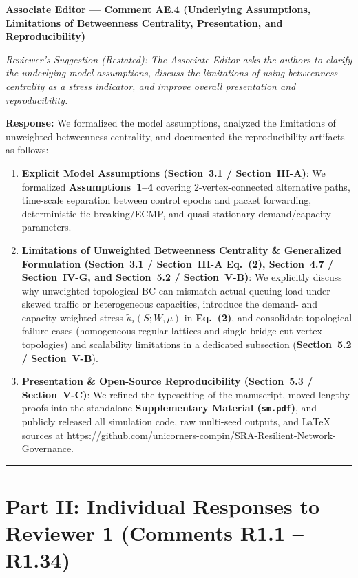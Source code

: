 \documentclass[11pt,a4paper]{article}
\newcommand{\cbox}[2]{%
  \vspace{0.6em}\noindent\textbf{#1}\par\smallskip
  \noindent\textit{Reviewer's Suggestion (Restated):} \textit{#2}\par\smallskip
}
\begin{document}
\hrulefill

\cbox{Associate Editor --- Comment AE.4 (Underlying Assumptions, Limitations of Betweenness Centrality, Presentation, and Reproducibility)}{The Associate Editor asks the authors to clarify the underlying model assumptions, discuss the limitations of using betweenness centrality as a stress indicator, and improve overall presentation and reproducibility.}

\noindent\textbf{Response:} We formalized the model assumptions, analyzed the limitations of unweighted betweenness centrality, and documented the reproducibility artifacts as follows:
\begin{enumerate}[leftmargin=1.8em]
    \item \textbf{Explicit Model Assumptions (Section~3.1 / Section~III-A)}: We formalized \textbf{Assumptions~1--4} covering 2-vertex-connected alternative paths, time-scale separation between control epochs and packet forwarding, deterministic tie-breaking/ECMP, and quasi-stationary demand/capacity parameters.
    \item \textbf{Limitations of Unweighted Betweenness Centrality \& Generalized Formulation (Section~3.1 / Section~III-A Eq.~(2), Section~4.7 / Section~IV-G, and Section~5.2 / Section~V-B)}: We explicitly discuss why unweighted topological BC can mismatch actual queuing load under skewed traffic or heterogeneous capacities, introduce the demand- and capacity-weighted stress $\widetilde{\kappa}_i(S; W, \mu)$ in \textbf{Eq.~(2)}, and consolidate topological failure cases (homogeneous regular lattices and single-bridge cut-vertex topologies) and scalability limitations in a dedicated subsection (\textbf{Section~5.2 / Section~V-B}).
    \item \textbf{Presentation \& Open-Source Reproducibility (Section~5.3 / Section~V-C)}: We refined the typesetting of the manuscript, moved lengthy proofs into the standalone \textbf{Supplementary Material (\texttt{sm.pdf})}, and publicly released all simulation code, raw multi-seed outputs, and \LaTeX{} sources at \url{https://github.com/unicorners-compin/SRA-Resilient-Network-Governance}.
\end{enumerate}

\vspace{0.5em}
\hrule
\section*{Part II: Individual Responses to Reviewer 1 (Comments R1.1 -- R1.34)}
\end{document}
